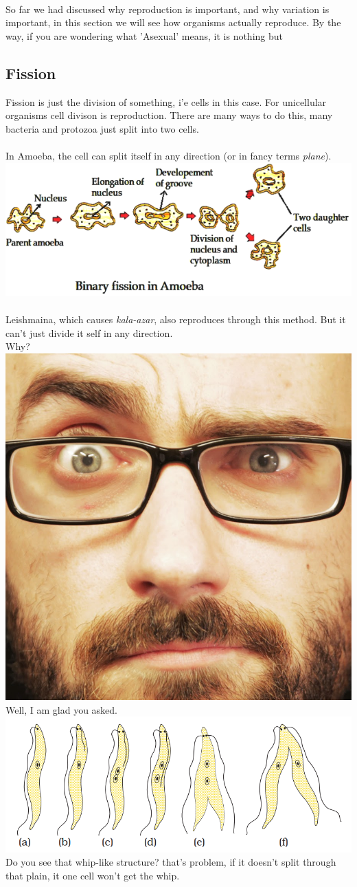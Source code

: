 \documentclass[A4]{article}
\newcommand{\vsauce}{\includegraphics[scale=0.015]{vsauce-eyes.jpg}}
\begin{document}
     \paragraph{}
     So far we had discussed why reproduction is important, and why variation is important, in this section we will see how organisms actually reproduce.
     By the way, if you are wondering what 'Asexual' means, it is nothing but 
     \subsection*{Fission}
     Fission is just the division of something, i'e cells in this case. 
     For unicellular organisms cell divison is reproduction.
     There are many ways to do this, many bacteria and protozoa just split into two cells.
     \paragraph{}
     In Amoeba, the cell can split itself in any direction (or in fancy terms \emph{plane}).
     \includegraphics[scale=0.5]{Binary-fission-in-amoeba.png}
     \paragraph{}
     Leishmaina, which causes \emph{kala-azar}, also reproduces through this method. But it can't just divide it self in any direction. \\
     Why? \vsauce \\
     Well, I am glad you asked. \\
     \includegraphics[scale=0.4]{Leishmania-fission.png}\\
     Do you see that whip-like structure? that's problem, if it doesn't split through that plain, it one cell won't get the whip. \\
\end{document}
